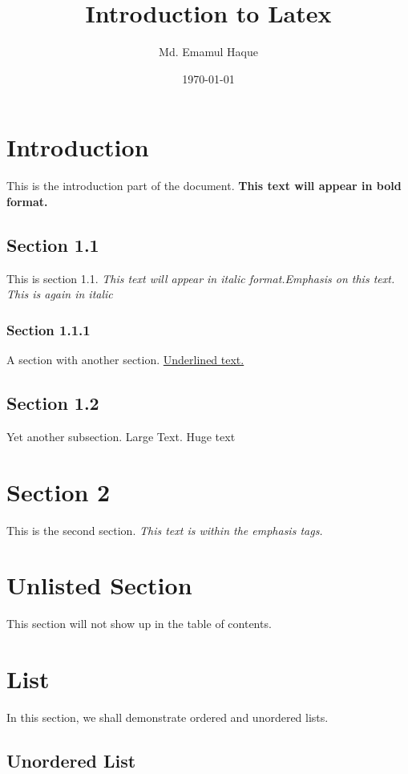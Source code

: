 \documentclass[14pt]{article}
\title{Introduction to Latex}
\author{Md. Emamul Haque}
\date{\today}
\begin{document}
    \maketitle
    \tableofcontents

    \pagebreak
    
    \section{Introduction}
    This is the introduction part of the document. \textbf{This text will appear in bold format.}

    \subsection{Section 1.1}
    This is section 1.1. \textit{This text will appear in italic format.\emph{Emphasis on this text}. This is again in italic}

    \subsubsection{Section 1.1.1}
    A section with another section. \underline{Underlined text.}

    \subsection{Section 1.2}
    Yet another subsection. \Large{Large Text}. {\huge Huge text}

    \section{Section 2}
    This is the second section. \emph{This text is within the emphasis tags.}

    \section*{Unlisted Section}
    This section will not show up in the table of contents.

    \section{List}
    In this section, we shall demonstrate ordered and unordered lists.

    \subsection{Unordered List}
\end{document}

